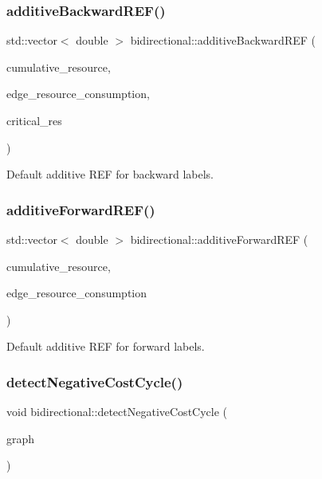 \subsubsection{\texorpdfstring{additive\+Backward\+R\+E\+F()}{additiveBackwardREF()}}
{\footnotesize\ttfamily std\+::vector$<$ double $>$ bidirectional\+::additive\+Backward\+R\+EF (\begin{DoxyParamCaption}\item[{const std\+::vector$<$ double $>$ \&}]{cumulative\+\_\+resource,  }\item[{const std\+::vector$<$ double $>$ \&}]{edge\+\_\+resource\+\_\+consumption,  }\item[{const int \&}]{critical\+\_\+res }\end{DoxyParamCaption})}



Default additive R\+EF for backward labels. 

\mbox{\label{namespacebidirectional_a6b3d052fd58c8158b4e7a79acbed3c0e}} 
\subsubsection{\texorpdfstring{additive\+Forward\+R\+E\+F()}{additiveForwardREF()}}
{\footnotesize\ttfamily std\+::vector$<$ double $>$ bidirectional\+::additive\+Forward\+R\+EF (\begin{DoxyParamCaption}\item[{const std\+::vector$<$ double $>$ \&}]{cumulative\+\_\+resource,  }\item[{const std\+::vector$<$ double $>$ \&}]{edge\+\_\+resource\+\_\+consumption }\end{DoxyParamCaption})}



Default additive R\+EF for forward labels. 

\mbox{\label{namespacebidirectional_a13e4a7c0617b0c9092e57cba21c75438}} 
\subsubsection{\texorpdfstring{detect\+Negative\+Cost\+Cycle()}{detectNegativeCostCycle()}}
{\footnotesize\ttfamily void bidirectional\+::detect\+Negative\+Cost\+Cycle (\begin{DoxyParamCaption}\item[{\hyperlink{classbidirectional_1_1DiGraph}{Di\+Graph} $\ast$}]{graph }\end{DoxyParamCaption})}

